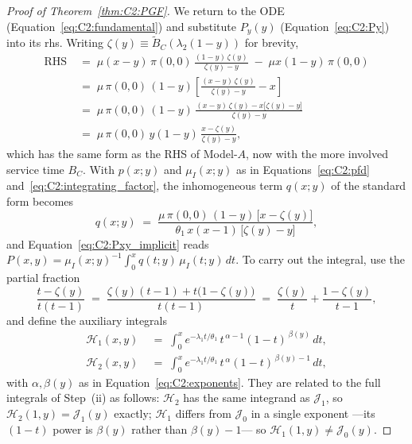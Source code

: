 \begin{proof}[Proof of Theorem~\ref{thm:C2:PGF}]
We return to the ODE (Equation~\eqref{eq:C2:fundamental}) and substitute $P_y(y)$ (Equation~\eqref{eq:C2:Py}) into its rhs. Writing $\zeta(y)\equiv\widetilde{B}_C(\lambda_2(1-y))$ for brevity,
\begin{align*}
    \text{RHS}
    &\;=\; \mu(x-y)\,\pi(0,0)\,\frac{(1-y)\,\zeta(y)}{\zeta(y) - y} \;-\; \mu x(1-y)\,\pi(0,0) \\
    &\;=\; \mu\,\pi(0,0)\,(1-y)\!\left[\frac{(x-y)\,\zeta(y)}{\zeta(y) - y} - x\right] \\
    &\;=\; \mu\,\pi(0,0)\,(1-y)\,\frac{(x-y)\,\zeta(y) - x\bigl[\zeta(y) - y\bigr]}{\zeta(y) - y} \\
    &\;=\; \mu\,\pi(0,0)\,y(1-y)\,\frac{x - \zeta(y)}{\zeta(y) - y},
\end{align*}
which has the same form as the RHS of Model-$A$, now with the more involved service time $B_C$. With $p(x;y)$ and $\mu_I(x;y)$ as in Equations~\eqref{eq:C2:pfd} and~\eqref{eq:C2:integrating_factor}, the inhomogeneous term $q(x;y)$ of the standard form becomes
\begin{equation*}
    q(x;y) \;=\; \frac{\mu\,\pi(0,0)\,(1-y)\,\bigl[x-\zeta(y)\bigr]}{\theta_1\,x(x-1)\,\bigl[\zeta(y)-y\bigr]},
\end{equation*}
and Equation~\eqref{eq:C2:Pxy_implicit} reads $P(x,y)=\mu_I(x;y)^{-1}\int_0^x q(t;y)\,\mu_I(t;y)\,dt$. To carry out the integral, use the partial fraction
\begin{equation*}
    \frac{t-\zeta(y)}{t(t-1)}
    \;=\; \frac{\zeta(y)(t-1) + t\bigl(1-\zeta(y)\bigr)}{t(t-1)}
    \;=\; \frac{\zeta(y)}{t} + \frac{1-\zeta(y)}{t-1},
\end{equation*}
and define the auxiliary integrals
\begin{align*}
    \mathcal{H}_1(x,y) &\;=\; \int_0^x e^{-\lambda_1 t/\theta_1}\,t^{\,\alpha-1}(1-t)^{\,\beta(y)}\,dt,  \\
    \mathcal{H}_2(x,y) &\;=\; \int_0^x e^{-\lambda_1 t/\theta_1}\,t^{\,\alpha}(1-t)^{\,\beta(y)-1}\,dt,
\end{align*}
with $\alpha,\beta(y)$ as in Equation~\eqref{eq:C2:exponents}. They are related to the full integrals of Step~(ii) as follows: $\mathcal{H}_2$ has the same integrand as $\mathcal{J}_1$, so $\mathcal{H}_2(1,y)=\mathcal{J}_1(y)$ exactly; $\mathcal{H}_1$ differs from $\mathcal{J}_0$ in a single exponent ---its $(1-t)$ power is $\beta(y)$ rather than $\beta(y)-1$--- so $\mathcal{H}_1(1,y)\neq\mathcal{J}_0(y)$.


\end{proof}
